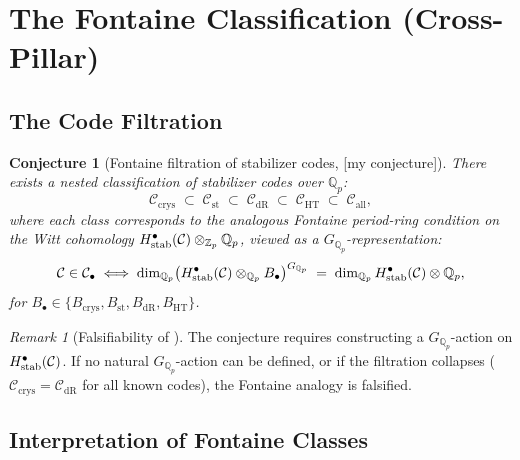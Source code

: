 \documentclass[12pt]{article}
\theoremstyle{definition}
\theoremstyle{plain}
\newtheorem{conjecture}{Conjecture}[section]
\theoremstyle{remark}
\newtheorem{remark}{Remark}[section]
\newcommand{\myconj}{{\color{orange}[\textsf{my conjecture}]}}
\newcommand{\Zp}{\mathbb{Z}_p}
\newcommand{\Qp}{\mathbb{Q}_p}
\newcommand{\cC}{\mathcal{C}}
\newcommand{\Bcrys}{B_{\mathrm{crys}}}
\newcommand{\Bst}{B_{\mathrm{st}}}
\newcommand{\BdR}{B_{\mathrm{dR}}}
\newcommand{\BHT}{B_{\mathrm{HT}}}
\begin{document}
\section{The Fontaine Classification (Cross-Pillar)}
\label{sec:fontaine}

\subsection{The Code Filtration}

\begin{conjecture}[Fontaine filtration of stabilizer codes, \myconj]\label{conj:fontaine-filtration}
There exists a nested classification of stabilizer codes over $\Qp$:
\[
\cC_{\mathrm{crys}}\;\subset\;\cC_{\mathrm{st}}\;\subset\;\cC_{\mathrm{dR}}\;\subset\;\cC_{\mathrm{HT}}\;\subset\;\cC_{\mathrm{all}},
\]
where each class corresponds to the analogous Fontaine period-ring condition on the Witt cohomology $H^{\bullet}_{\textup{stab}}(\cC)\otimes_{\Zp}\Qp$, viewed as a $G_{\Qp}$-representation:
\[
\cC\in\cC_{\bullet}\;\Longleftrightarrow\;
\dim_{\Qp}\bigl(H^{\bullet}_{\textup{stab}}(\cC)\otimes_{\Qp}B_{\bullet}\bigr)^{G_{\Qp}}
\;=\;\dim_{\Qp}H^{\bullet}_{\textup{stab}}(\cC)\otimes\Qp,
\]
for $B_{\bullet}\in\{\Bcrys,\Bst,\BdR,\BHT\}$.
\end{conjecture}

\begin{remark}[Falsifiability of ]
The conjecture requires constructing a $G_{\Qp}$-action on $H^{\bullet}_{\textup{stab}}(\cC)$. If no natural $G_{\Qp}$-action can be defined, or if the filtration collapses ($\cC_{\mathrm{crys}}=\cC_{\mathrm{dR}}$ for all known codes), the Fontaine analogy is falsified.
\end{remark}

\subsection{Interpretation of Fontaine Classes}
\end{document}
